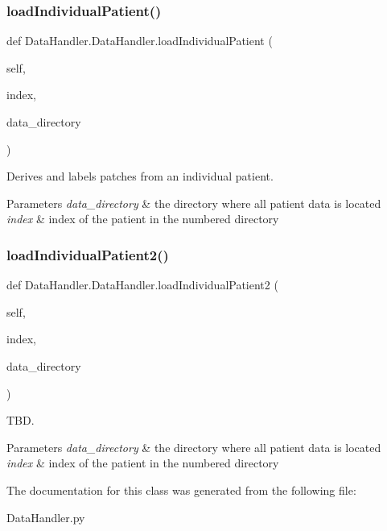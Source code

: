 \subsubsection{\texorpdfstring{load\+Individual\+Patient()}{loadIndividualPatient()}}
{\footnotesize\ttfamily def Data\+Handler.\+Data\+Handler.\+load\+Individual\+Patient (\begin{DoxyParamCaption}\item[{}]{self,  }\item[{}]{index,  }\item[{}]{data\+\_\+directory }\end{DoxyParamCaption})}



Derives and labels patches from an individual patient. 


\begin{DoxyParams}{Parameters}
{\em data\+\_\+directory} & the directory where all patient data is located \\
\hline
{\em index} & index of the patient in the numbered directory \\
\hline
\end{DoxyParams}
\mbox{\label{classDataHandler_1_1DataHandler_adb62cd0555482a270a18f9801938a00d}} 
\subsubsection{\texorpdfstring{load\+Individual\+Patient2()}{loadIndividualPatient2()}}
{\footnotesize\ttfamily def Data\+Handler.\+Data\+Handler.\+load\+Individual\+Patient2 (\begin{DoxyParamCaption}\item[{}]{self,  }\item[{}]{index,  }\item[{}]{data\+\_\+directory }\end{DoxyParamCaption})}



T\+BD. 


\begin{DoxyParams}{Parameters}
{\em data\+\_\+directory} & the directory where all patient data is located \\
\hline
{\em index} & index of the patient in the numbered directory \\
\hline
\end{DoxyParams}


The documentation for this class was generated from the following file\+:\begin{DoxyCompactItemize}
\item 
Data\+Handler.\+py\end{DoxyCompactItemize}
